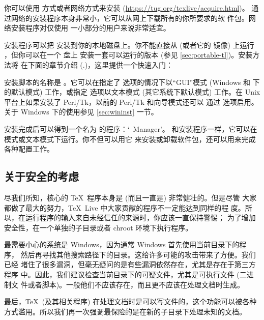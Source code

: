 \documentclass{article}
\begin{document}
你可以使用 \DVD{} 方式或者网络方式来安装 \TL{}
(\url{https://tug.org/texlive/acquire.html})。
通过网络的安装程序本身非常小，它可以从网上下载所有的你所要求的软
件包。网络安装程序对仅使用 \TL{} 一小部分的用户来说非常适宜。

\DVD{} 安装程序可以把 \TL{} 安装到你的本地磁盘上。你不能直接从 \TK{}
\DVD{} (或者它的  镜像) 上运行 \TL{}，但你可以在一个 \USB{} 盘上
安装一套可以运行的版本 (参见 \ref{sec:portable-tl})。安装方法将
在下面的章节介绍 (\p.\pageref{sec:install})，这里提供一个快速入门：

\begin{itemize*}

  \item 安装脚本的名称是 。它可以在指定了
   选项的情况下以“GUI”模式 (Windows 和 \MacOSX{} 下的默认模式)
  工作，或指定  选项以文本模式 (其它系统下默认模式)
  工作。在 Unix 平台上如果安装了 Perl/Tk，以前的 Perl/Tk 和向导模式还可以
  通过  选项启用。关于 Windows 下的使用参见
  \ref{sec:wininst} 一节。

  \item 安装完成后可以得到一个名为  的程序：`\TL\ Manager'。
  和安装程序一样，它可以在 \GUI{} 模式或文本模式下运行。你不但可以用它
  来安装或卸载软件包，还可以用来完成各种配置工作。

\end{itemize*}

\subsection{关于安全的考虑}
\label{sec:security}

尽我们所知，核心的 \TeX\ 程序本身是 (而且一直是) 非常健壮的。但是尽管
大家都做了最大的努力，\TeX\ Live 中大家贡献的程序不一定能达到同样的程
度。所以，在运行程序的输入来自未经信任的来源时，你应该一直保持警惕；
为了增加安全性，在一个单独的子目录或者 chroot 环境下执行程序。

最需要小心的系统是 Windows，因为通常 Windows 首先使用当前目录下的程序，
然后再寻找其他搜索路径下的目录。这给许多可能的攻击带来了方便。我们已经
堵住了很多漏洞，但毫无疑问的是有些漏洞依然存在，尤其是存在于第三方程序
中。因此，我们建议检查当前目录下的可疑文件，尤其是可执行文件 (二进制文
件或者脚本)。一般他们不应该存在，而且更不应该在处理文档时生成。

最后，\TeX\ (及其相关程序) 在处理文档时是可以写文件的，这个功能可以被各种
方式滥用。所以我们再一次强调最保险的是在新的子目录下处理未知的文档。
\end{document}
